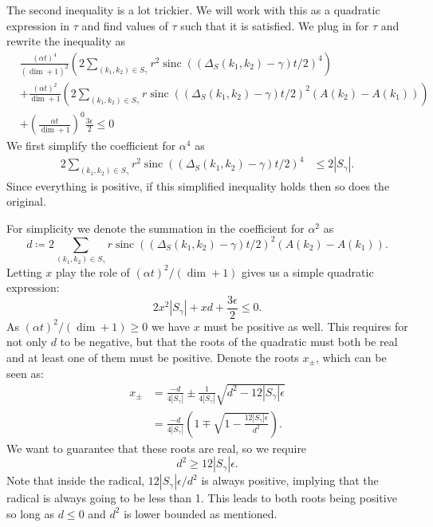 \documentclass{article}
\newcommand{\parens}[1]{\left( #1 \right)}
\DeclareMathOperator{\sinc}{sinc}
\begin{document}
The second inequality is a lot trickier. We will work with this as a quadratic expression in $\tau$ and find values of $\tau$ such that it is satisfied. We plug in for $\tau$ and rewrite the inequality as 
\begin{align}
    &\frac{(\alpha t)^4}{(\dim + 1)^2} \parens{2  \sum_{(k_1, k_2) \in S_{\gamma}} r^2 \sinc((\Delta_S(k_1, k_2) - \gamma) t/2)^4} \nonumber \\
    &+ \frac{(\alpha t)^2}{\dim + 1} \parens{2  \sum_{(k_1, k_2) \in S_{\gamma}}r \sinc((\Delta_S(k_1, k_2) - \gamma) t/2)^2 (A(k_2) - A(k_1))} \nonumber \\
    &+ \parens{\frac{\alpha t}{\dim + 1}}^0 \frac{3 \epsilon}{2} \leq 0
\end{align}
We first simplify the coefficient for $\alpha^4$ as 
\begin{align}
    2 \sum_{(k_1, k_2) \in S_{\gamma}} r^2 \sinc((\Delta_S(k_1, k_2) - \gamma) t/2)^4 &\leq 2 |S_{\gamma}|.
\end{align}
Since everything is positive, if this simplified inequality holds then so does the original. 

For simplicity we denote the summation in the coefficient for $\alpha^2$ as
$$d \coloneqq 2 \sum_{(k_1, k_2) \in S_{\gamma}} r \sinc((\Delta_S(k_1, k_2) - \gamma) t/2)^2 (A(k_2) - A(k_1)).$$
Letting $x$ play the role of $(\alpha t)^2 / (\dim + 1)$ gives us a simple quadratic expression:
\begin{equation}
    2 x^2 |S_{\gamma}| + x d + \frac{3 \epsilon}{2} \leq 0.
\end{equation}
As $(\alpha t)^2 / (\dim + 1) \geq 0$ we have $x$ must be positive as well. This requires for not only $d$ to be negative, but that the roots of the quadratic must both be real and at least one of them must be positive. Denote the roots $x_{\pm}$, which can be seen as:
\begin{align}
    x_{\pm} &= \frac{-d}{4 |S_{\gamma}|} \pm \frac{1}{4 |S_{\gamma}|} \sqrt{d^2 - 12 |S_{\gamma}| \epsilon} \\
    &= \frac{-d}{4 |S_{\gamma}|} \parens{1 \mp \sqrt{1 - \frac{12 |S_{\gamma}| \epsilon}{d^2}}}.
\end{align}
We want to guarantee that these roots are real, so we require 
\begin{equation}
    d^2 \geq 12 |S_{\gamma}| \epsilon. \label{eq:d_squared_epsilon_bound}
\end{equation}
Note that inside the radical, $12  |S_{\gamma}| \epsilon / d^2$ is always positive, implying that the radical is always going to be less than 1. This leads to both roots being positive so long as $d \leq 0$ and $d^2$ is lower bounded as mentioned.
\end{document}
